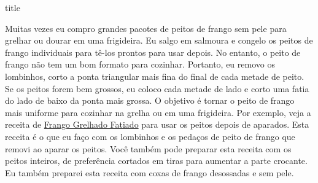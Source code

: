 \documentclass [11pt, papel de carta] {article}
\begin{document}
 {title}

Muitas vezes eu compro grandes pacotes de peitos de frango sem pele para grelhar ou dourar em uma frigideira. Eu salgo em salmoura e congelo os peitos de frango individuais para tê-los prontos para usar depois. No entanto, o peito de frango não tem um bom formato para cozinhar. Portanto, eu removo os lombinhos, corto a ponta triangular mais fina do final de cada metade de peito. Se os peitos forem bem grossos, eu coloco cada metade de lado e corto uma fatia do lado de baixo da ponta mais grossa. O objetivo é tornar o peito de frango mais uniforme para cozinhar na grelha ou em uma frigideira. Por exemplo, veja a receita de \href {SlicedGrilledChicken.html} {Frango Grelhado Fatiado} para usar os peitos depois de aparados. Esta receita é o que eu faço com os lombinhos e os pedaços de peito de frango que removi ao aparar os peitos. Você também pode preparar esta receita com os peitos inteiros, de preferência cortados em tiras para aumentar a parte crocante. Eu também preparei esta receita com coxas de frango desossadas e sem pele.
\end{document}
